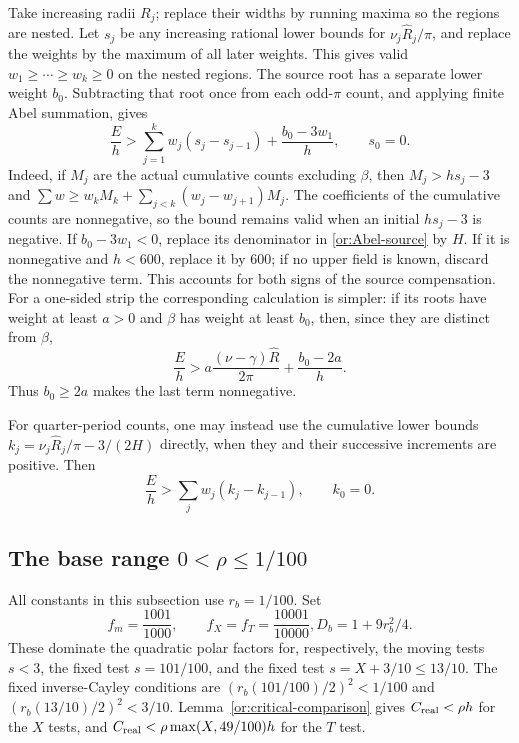 Take increasing radii $R_j$; replace their widths by running maxima
so the regions are nested.  Let $s_j$ be any increasing rational lower
bounds for $\nu_j\widehat R_j/\pi$, and replace the weights by the
maximum of all later weights.  This gives valid
$w_1\ge\cdots\ge w_k\ge0$ on the nested regions.  The source root
has a separate lower weight $b_0$.  Subtracting that root once from
each odd-$\pi$ count, and applying finite Abel summation, gives
\begin{equation}\label{or:Abel-source}
 \frac Eh>
     \sum_{j=1}^k w_j(s_j-s_{j-1})+\frac{b_0-3w_1}{h},
                         \qquad s_0=0.
\end{equation}
Indeed, if $M_j$ are the actual cumulative counts excluding $\beta$,
then $M_j>hs_j-3$ and
$\sum w\ge w_kM_k+\sum_{j<k}(w_j-w_{j+1})M_j$.
The coefficients of the cumulative counts are nonnegative, so the bound
remains valid when an initial $hs_j-3$ is negative.
If $b_0-3w_1<0$, replace its denominator
in \eqref{or:Abel-source} by $H$.  If it is nonnegative and $h<600$,
replace it by $600$; if no upper field is known, discard the
nonnegative term.  This accounts for both signs of the source
compensation.
For a one-sided strip the corresponding calculation is simpler:
if its roots have weight at least $a>0$ and $\beta$ has weight at
least $b_0$, then, since they are distinct from $\beta$,
\begin{equation}\label{or:strip-source-compensation}
 \frac Eh>
 a\frac{(\nu-\gamma)\widehat R}{2\pi}+\frac{b_0-2a}{h}.
\end{equation}
Thus $b_0\ge2a$ makes the last term nonnegative.

For quarter-period counts, one may instead use the cumulative lower
bounds $k_j=\nu_j\widehat R_j/\pi-3/(2H)$ directly, when they and
their successive increments are positive.  Then
\begin{equation}\label{or:Abel-quarter}
                    \frac Eh>\sum_jw_j(k_j-k_{j-1}),\qquad k_0=0.
\end{equation}

\subsection{The base range $0<\rho\le1/100$}

All constants in this subsection use $r_b=1/100$.  Set
\begin{equation}\label{or:base-polar}
 f_m=\frac{1001}{1000},\qquad f_X=f_T=\frac{10001}{10000},
                    D_b=1+9r_b^2/4.
\end{equation}
These dominate the quadratic polar factors for, respectively, the
moving tests $s<3$, the fixed test $s=101/100$, and the fixed test
$s=X+3/10\le13/10$.  The fixed inverse-Cayley conditions are
$(r_b(101/100)/2)^2<1/100$ and
$(r_b(13/10)/2)^2<3/10$.  Lemma~\ref{or:critical-comparison} gives
$C_{\rm real}<\rho h$ for the $X$ tests, and
$C_{\rm real}<\rho\max(X,49/100)h$ for the $T$ test.

